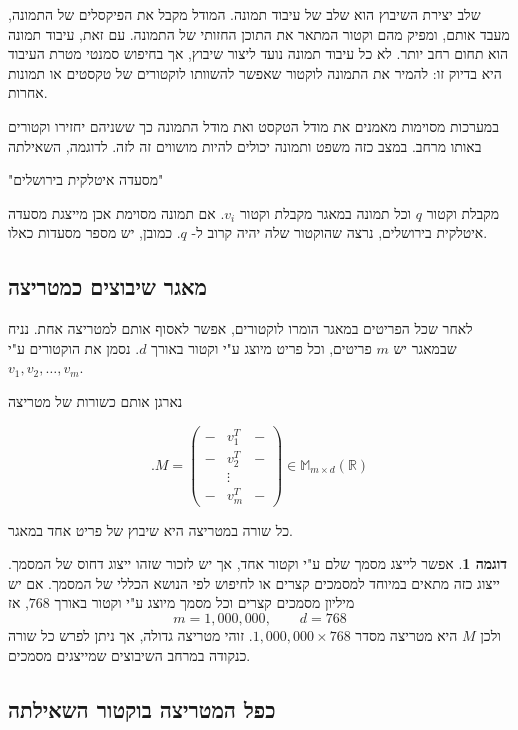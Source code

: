 \documentclass[12pt]{report}
\theoremstyle{plain}
\theoremstyle{definition}
\newtheorem{example}{דוגמה}[chapter]
\newcommand{\R}{\mathbb{R}}
\newcommand{\M}{\mathbb{M}}
\newcommand{\0}{\mathbf{0}}
\begin{document}
שלב יצירת השיבוץ הוא שלב של עיבוד תמונה. המודל מקבל את הפיקסלים של התמונה, מעבד אותם, ומפיק מהם וקטור המתאר את התוכן החזותי של התמונה. עם זאת, עיבוד תמונה הוא תחום רחב יותר. לא כל עיבוד תמונה נועד ליצור שיבוץ, אך בחיפוש סמנטי מטרת העיבוד היא בדיוק זו: להמיר את התמונה לוקטור שאפשר להשוותו לוקטורים של טקסטים או תמונות אחרות.

במערכות מסוימות מאמנים את מודל הטקסט ואת מודל התמונה כך ששניהם יחזירו וקטורים באותו מרחב.
במצב כזה משפט ותמונה יכולים להיות מושווים זה לזה.
לדוגמה, השאילתה

\begin{center}
"מסעדה איטלקית בירושלים"
\end{center}

מקבלת וקטור
$q$
וכל תמונה במאגר מקבלת וקטור
$v_i$.
אם תמונה מסוימת אכן מייצגת מסעדה איטלקית בירושלים, נרצה שהוקטור שלה יהיה קרוב ל-
$q$.
כמובן, יש מספר מסעדות כאלו.

\subsection*{מאגר שיבוצים כמטריצה}

לאחר שכל הפריטים במאגר הומרו לוקטורים, אפשר לאסוף אותם למטריצה אחת.
נניח שבמאגר יש
$m$
פריטים, וכל פריט מיוצג ע"י וקטור באורך
$d$.
נסמן את הוקטורים ע"י
$v_1,v_2,\ldots,v_m$.

נארגן אותם כשורות של מטריצה

$$
.M=
\begin{pmatrix}
- & v_1^T & -\\
- & v_2^T & -\\
  & \vdots &  \\
- & v_m^T & -
\end{pmatrix}\in\M_{m\times d}(\R)
$$

כל שורה במטריצה היא שיבוץ של פריט אחד במאגר.

\begin{example}

אפשר לייצג מסמך שלם ע"י וקטור אחד, אך יש לזכור שזהו ייצוג דחוס של המסמך.
ייצוג כזה מתאים במיוחד למסמכים קצרים או לחיפוש לפי הנושא הכללי של המסמך. אם יש מיליון מסמכים קצרים וכל מסמך מיוצג ע"י וקטור באורך
$768$,
אז
$$
m=1{,}000{,}000,\qquad d=768
$$
ולכן
$M$
היא מטריצה מסדר
$1{,}000{,}000\times 768$. 
זוהי מטריצה גדולה, אך ניתן לפרש כל שורה כנקודה במרחב השיבוצים שמייצגים מסמכים.

\end{example}

\subsection*{כפל המטריצה בוקטור השאילתה}
\end{document}
